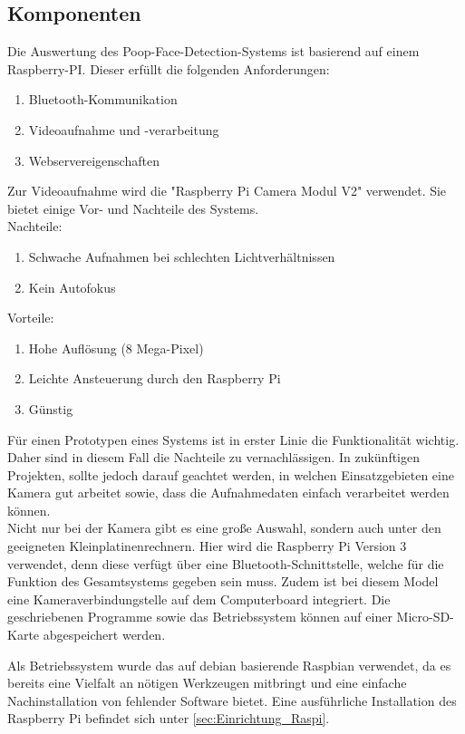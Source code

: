 \subsection{Komponenten}
\label{subsec:evalsys_hardware}

Die Auswertung des Poop-Face-Detection-Systems ist basierend auf einem Raspberry-PI. Dieser erfüllt die folgenden Anforderungen:

\begin{enumerate}
\item Bluetooth-Kommunikation
\item Videoaufnahme und -verarbeitung
\item Webservereigenschaften
\end{enumerate}

Zur Videoaufnahme wird die "Raspberry Pi Camera Modul V2" verwendet. Sie bietet einige Vor- und Nachteile des Systems. \\

Nachteile:
\begin{enumerate}
\item Schwache Aufnahmen bei schlechten Lichtverhältnissen
\item Kein Autofokus
\end{enumerate}
\vspace{0.35cm}

Vorteile:
\begin{enumerate}
\item Hohe Auflösung (8 Mega-Pixel)
\item Leichte Ansteuerung durch den Raspberry Pi
\item Günstig
\end{enumerate}

Für einen Prototypen eines Systems ist in erster Linie die Funktionalität wichtig. Daher sind in diesem Fall die Nachteile zu vernachlässigen. In zukünftigen Projekten, sollte jedoch darauf geachtet werden, in welchen Einsatzgebieten eine Kamera gut arbeitet sowie, dass die Aufnahmedaten einfach verarbeitet werden können.\cite{picam_website} \\

Nicht nur bei der Kamera gibt es eine große Auswahl, sondern auch unter den geeigneten Kleinplatinenrechnern. Hier wird die Raspberry Pi Version 3 verwendet, denn diese verfügt über eine Bluetooth-Schnittstelle, welche für die Funktion des Gesamtsystems gegeben sein muss. Zudem ist bei diesem Model eine Kameraverbindungstelle auf dem Computerboard integriert. Die geschriebenen Programme sowie das Betriebssystem können auf einer Micro-SD-Karte abgespeichert werden.\cite{raspi_datenblatt}

Als Betriebssystem wurde das auf debian basierende Raspbian verwendet, da es bereits eine Vielfalt an nötigen Werkzeugen mitbringt und eine einfache Nachinstallation von fehlender Software bietet. Eine ausführliche Installation des Raspberry Pi befindet sich unter \ref{sec:Einrichtung_Raspi}.
